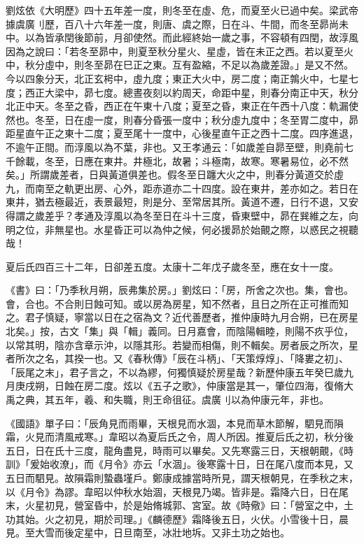 \begin{pinyinscope}
 劉炫依《大明歷》四十五年差一度，則冬至在虛、危，而夏至火已過中矣。梁武帝據虞廣刂歷，百八十六年差一度，則唐、虞之際，日在斗、牛間，而冬至昴尚未中。以為皆承閏後節前，月卻使然。而此經終始一歲之事，不容頓有四閏，故淳風因為之說曰：「若冬至昴中，則夏至秋分星火、星虛，皆在未正之西。若以夏至火中，秋分虛中，則冬至昴在巳正之東。互有盈縮，不足以為歲差證。」是又不然。今以四象分天，北正玄枵中，虛九度；東正大火中，房二度；南正鶉火中，七星七度；西正大梁中，昴七度。總晝夜刻以約周天，命距中星，則春分南正中天，秋分北正中天。冬至之昏，西正在午東十八度；夏至之昏，東正在午西十八度：軌漏使然也。冬至，日在虛一度，則春分昏張一度中；秋分虛九度中；冬至胃二度中，昴距星直午正之東十二度；夏至尾十一度中，心後星直午正之西十二度。四序進退，不逾午正間。而淳風以為不葉，非也。又王孝通云：「如歲差自昴至壁，則堯前七千餘載，冬至，日應在東井。井極北，故暑；斗極南，故寒。寒暑易位，必不然矣。」所謂歲差者，日與黃道俱差也。假冬至日躔大火之中，則春分黃道交於虛九，而南至之軌更出房、心外，距赤道亦二十四度。設在東井，差亦如之。若日在東井，猶去極最近，表景最短，則是分、至常居其所。黃道不遷，日行不退，又安得謂之歲差乎？孝通及淳風以為冬至日在斗十三度，昏東壁中，昴在巽維之左，向明之位，非無星也。水星昏正可以為仲之候，何必援昴於始覿之際，以惑民之視聽哉！



 夏后氏四百三十二年，日卻差五度。太康十二年戊子歲冬至，應在女十一度。



 《書》曰：「乃季秋月朔，辰弗集於房。」劉炫曰：「房，所舍之次也。集，會也。會，合也。不合則日蝕可知。或以房為房星，知不然者，且日之所在正可推而知之。君子慎疑，寧當以日在之宿為文？近代善歷者，推仲康時九月合朔，已在房星北矣。」按，古文「集」與「輯」義同。日月嘉會，而陰陽輯睦，則陽不疚乎位，以常其明，陰亦含章示沖，以隱其形。若變而相傷，則不輯矣。房者辰之所次，星者所次之名，其揆一也。又《春秋傳》「辰在斗柄」、「天策焞焞」、「降婁之初」、「辰尾之末」，君子言之，不以為繆，何獨慎疑於房星哉？新歷仲康五年癸巳歲九月庚戌朔，日蝕在房二度。炫以《五子之歌》，仲康當是其一，肇位四海，復脩大禹之典，其五年，羲、和失職，則王命徂征。虞廣刂以為仲康元年，非也。



 《國語》單子曰：「辰角見而雨畢，天根見而水涸，本見而草木節解，駟見而隕霜，火見而清風戒寒。」韋昭以為夏后氏之令，周人所因。推夏后氏之初，秋分後五日，日在氏十三度，龍角盡見，時雨可以畢矣。又先寒露三日，天根朝覿，《時訓》「爰始收潦」，而《月令》亦云「水涸」。後寒露十日，日在尾八度而本見，又五日而駟見。故隕霜則蟄蟲墐戶。鄭康成據當時所見，謂天根朝見，在季秋之末，以《月令》為謬。韋昭以仲秋水始涸，天根見乃竭。皆非是。霜降六日，日在尾末，火星初見，營室昏中，於是始脩城郭、宮室。故《時儆》曰：「營室之中，土功其始。火之初見，期於司理。」《麟德歷》霜降後五日，火伏。小雪後十日，晨見。至大雪而後定星中，日旦南至，冰壯地坼。又非土功之始也。




\end{pinyinscope}
